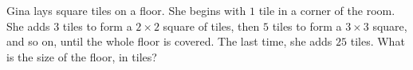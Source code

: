 Gina lays square tiles on a floor. She begins with $1$ tile in a corner of the room. She adds $3$ tiles to form a $2\times2$ square of tiles, then $5$ tiles to form a $3\times3$ square, and so on, until the whole floor is covered. The last time, she adds $25$ tiles. What is the size of the floor, in tiles?
